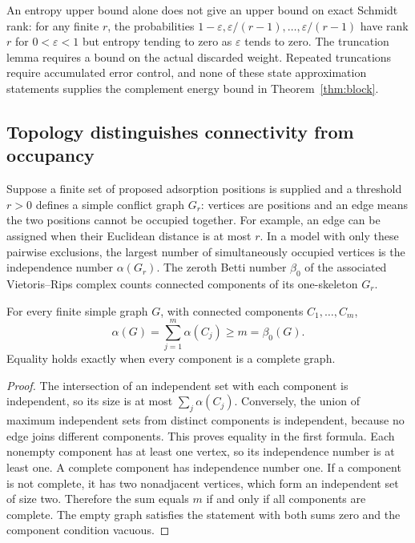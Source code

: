 An entropy upper bound alone does not give an upper bound on exact Schmidt
rank: for any finite $r$, the probabilities
$1-\varepsilon,\varepsilon/(r-1),\ldots,\varepsilon/(r-1)$ have rank
$r$ for $0<\varepsilon<1$ but entropy tending to zero as
$\varepsilon$ tends to zero. The truncation lemma requires a bound on the
actual discarded weight. Repeated truncations require accumulated error
control, and none of these state approximation statements supplies the
complement energy bound in Theorem~\ref{thm:block}.

\subsection{Topology distinguishes connectivity from occupancy}
Suppose a finite set of proposed adsorption positions is supplied and a
threshold $r>0$ defines a simple conflict graph $G_r$: vertices are
positions and an edge means the two positions cannot be occupied together.
For example, an edge can be assigned when their Euclidean distance is at most
$r$. In a model with only these pairwise exclusions, the largest number of
simultaneously occupied vertices is the independence number $\alpha(G_r)$.
The zeroth Betti number $\beta_0$ of the associated Vietoris--Rips complex
counts connected components of its one-skeleton $G_r$.

\begin{proposition}
\label{prop:graph}
For every finite simple graph $G$, with connected components
$C_1,\ldots,C_m$,
\[
 \alpha(G)=\sum_{j=1}^m\alpha(C_j)\ge m=\beta_0(G).
\]
Equality holds exactly when every component is a complete graph.
\end{proposition}
\begin{proof}
The intersection of an independent set with each component is independent,
so its size is at most $\sum_j\alpha(C_j)$. Conversely, the union of
maximum independent sets from distinct components is independent, because
no edge joins different components. This proves equality in the first
formula. Each nonempty component has at least one vertex, so its independence
number is at least one. A complete component has independence number one.
If a component is not complete, it has two nonadjacent vertices, which form
an independent set of size two. Therefore the sum equals $m$ if and only
if all components are complete. The empty graph satisfies the statement
with both sums zero and the component condition vacuous.
\end{proof}

